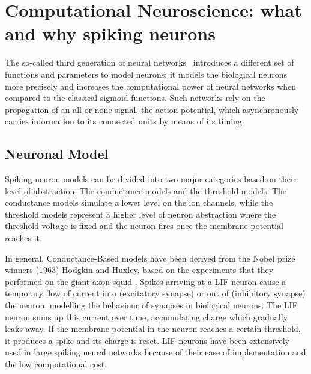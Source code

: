\section{Computational Neuroscience: what and why spiking neurons}
\label{sec:comp}

The so-called third generation of neural networks~\cite{maass1997networks} introduces a different set of functions and parameters to model neurons;
it models the biological neurons more precisely and increases the computational power of neural networks when compared to the classical sigmoid functions.
Such networks rely on the propagation of an all-or-none signal, the action potential, which asynchronously carries information to its connected units by means of its timing.
\subsection{Neuronal Model}
Spiking neuron models can be divided into two major categories \cite{gernstbook} based on their level of abstraction: The conductance models and the threshold models.
The conductance models simulate a lower level on the ion channels, while the threshold models represent a higher level of neuron abstraction where the threshold voltage is fixed and the neuron fires once the membrane potential reaches it.

In general, Conductance-Based models have been derived from the Nobel prize winners (1963) Hodgkin and Huxley, based on the experiments that they performed on the giant axon squid \cite{hhmodel}.
Spikes arriving at a LIF neuron cause a temporary flow of current into (excitatory synapse) or out of (inhibitory synapse) the neuron, modelling the behaviour of synapses in biological neurons.
The LIF neuron sums up this current over time, accumulating charge which gradually leaks away.
If the membrane potential in the neuron reaches a certain threshold, it produces a spike and its charge is reset.
LIF neurons have been extensively used in large spiking neural networks \cite{Delorme1999989} because of their ease of implementation and the low computational cost.

